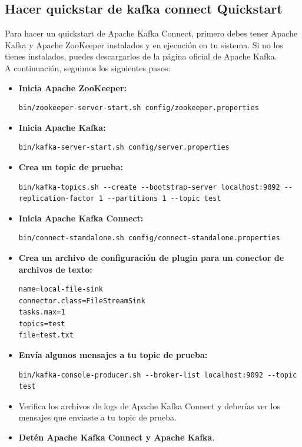 \documentclass{article}
\begin{document}
\subsection{Hacer quickstar de kafka connect Quickstart}
Para hacer un quickstart de Apache Kafka Connect, primero debes tener Apache Kafka y Apache ZooKeeper instalados y en ejecución en tu sistema. Si no los tienes instalados, puedes descargarlos de la página oficial de Apache Kafka.\\
A continuación, seguimos los siguientes pasos:
\begin{itemize}
    \item \textbf{Inicia Apache ZooKeeper:}
    \begin{lstlisting}[numbers=none]
bin/zookeeper-server-start.sh config/zookeeper.properties\end{lstlisting}
    \item \textbf{Inicia Apache Kafka:}
    \begin{lstlisting}[numbers=none]
bin/kafka-server-start.sh config/server.properties\end{lstlisting}
    \item \textbf{Crea un topic de prueba:}
    \begin{lstlisting}[numbers=none]
bin/kafka-topics.sh --create --bootstrap-server localhost:9092 --replication-factor 1 --partitions 1 --topic test\end{lstlisting}
    \item \textbf{Inicia Apache Kafka Connect:}
    \begin{lstlisting}[numbers=none]
bin/connect-standalone.sh config/connect-standalone.properties\end{lstlisting}
    \item \textbf{Crea un archivo de configuración de plugin para un conector de archivos de texto:}
    \begin{lstlisting}[numbers=none]
name=local-file-sink
connector.class=FileStreamSink
tasks.max=1
topics=test
file=test.txt\end{lstlisting}
    \item \textbf{Envía algunos mensajes a tu topic de prueba:}
    \begin{lstlisting}[numbers=none]
bin/kafka-console-producer.sh --broker-list localhost:9092 --topic test\end{lstlisting}
    \item Verifica los archivos de logs de Apache Kafka Connect y deberías ver los mensajes que enviaste a tu topic de prueba.
    \item \textbf{Detén Apache Kafka Connect y Apache Kafka}.\\

\end{itemize}
\end{document}
